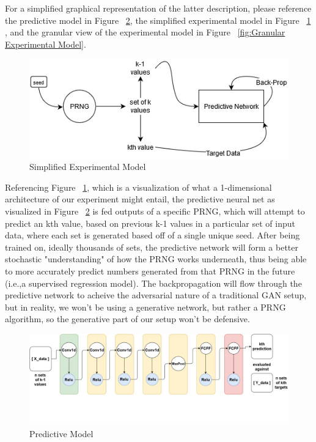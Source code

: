 \documentclass[conference]{IEEEtran}
\begin{document}
For a simplified graphical representation of the latter description, please reference the predictive model in Figure ~\ref{fig:Predictive Model}, the simplified experimental model in Figure ~\ref{fig:Simplified Experimental Model} , and the granular view of the experimental model in Figure ~\ref{fig:Granular Experimental Model}.


\begin{figure}[H]
\centering
\includegraphics[width=1\linewidth]{./Images/SimpleModel.png}
\caption{Simplified Experimental Model}
\label{fig:Simplified Experimental Model}
\end{figure}

Referencing Figure ~\ref{fig:Simplified Experimental Model}, which is a visualization of what a 1-dimensional architecture of our experiment might entail, the predictive neural net as visualized in Figure ~\ref{fig:Predictive Model} is fed outputs of a specific PRNG, which will attempt to predict an kth value, based on previous k-1 values in a particular set of input data, where each set is generated based off of a single unique seed. After being trained on, ideally thousands of sets, the predictive network will form a better stochastic "understanding" of how the PRNG works underneath, thus being able to more accurately predict numbers generated from that PRNG in the future (i.e.,a supervised regression model). The backpropagation will flow through the predictive network to acheive the adversarial nature of a traditional GAN setup, but in reality, we won't be using a generative network, but rather a PRNG algorithm, so the generative part of our setup won't be defensive.


\begin{figure}[H]
\centering
\includegraphics[width=1\linewidth]{./Images/PredictiveModel.png}
\caption{Predictive Model}
\label{fig:Predictive Model}
\end{figure}
\end{document}
